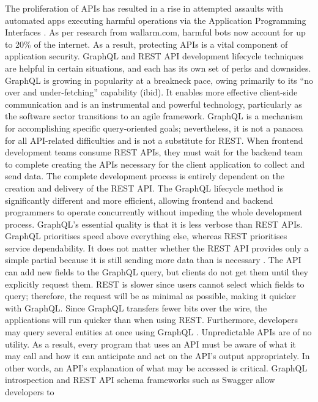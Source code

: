 The proliferation of APIs has resulted in a rise in attempted assaults with
automated apps executing harmful operations via the Application Programming
Interfaces \citep{ hartigInitialAnalysisFacebook2017}. As per research from
wallarm.com, harmful bots now account for up to 20\% of the internet. As a
result, protecting APIs is a vital component of application security. GraphQL
and REST API development lifecycle techniques are helpful in certain situations,
and each has its own set of perks and downsides. GraphQL is growing in
popularity at a breakneck pace, owing primarily to its ``no over and
under-fetching'' capability (ibid). It enables more effective client-side
communication and is an instrumental and powerful technology, particularly as
the software sector transitions to an agile framework. GraphQL is a mechanism
for accomplishing specific query-oriented goals; nevertheless, it is not a
panacea for all API-related difficulties and is not a substitute for REST. When
frontend development teams consume REST APIs, they must wait for the backend
team to complete creating the APIs necessary for the client application to
collect and send data. The complete development process is entirely dependent on
the creation and delivery of the REST API. The GraphQL lifecycle method is
significantly different and more efficient, allowing frontend and backend
programmers to operate concurrently without impeding the whole development
process. GraphQL's essential quality is that it is less verbose than REST APIs.
GraphQL prioritises speed above everything else, whereas REST prioritises
service dependability. It does not matter whether the REST API provides only a
simple partial because it is still sending more data than is necessary
\citep{vadlamaniCanGraphQLReplace2021}. The API can add new fields to the
GraphQL query, but clients do not get them until they explicitly request them.
REST is slower since users cannot select which fields to query; therefore, the
request will be as minimal as possible, making it quicker with GraphQL. Since
GraphQL transfers fewer bits over the wire, the applications will run quicker
than when using REST. Furthermore, developers may query several entities at once
using GraphQL \citep{lawiEvaluatingGraphQLREST2021}. Unpredictable APIs are of
no utility. As a result, every program that uses an API must be aware of what it
may call and how it can anticipate and act on the API's output appropriately. In
other words, an API's explanation of what may be accessed is critical. GraphQL
introspection and REST API schema frameworks such as Swagger allow developers to
